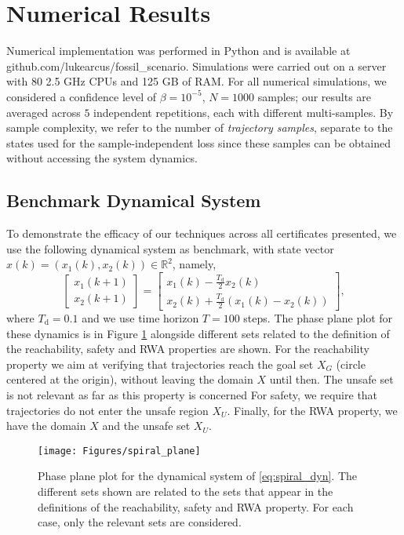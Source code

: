 \section{Numerical Results}
\label{sec:exp}

Numerical implementation was performed in Python and is available at github.com/lukearcus/fossil\_scenario. 
Simulations were carried out on a server with 80 2.5 GHz CPUs and 125 GB of RAM. 
For all numerical simulations, we considered a confidence level of $\beta=10^{-5}$, $N=1000$ samples; our results are averaged across $5$ independent repetitions, each with different multi-samples. 
By sample complexity, we refer to the number of \emph{trajectory samples}, separate to the states used for the sample-independent loss since these samples can be obtained without accessing the system dynamics.

\subsection{Benchmark Dynamical System}

To demonstrate the efficacy of our techniques across all certificates presented, we use the following dynamical system as benchmark, with state vector $x(k) = (x_1(k), x_2(k)) \in \mathbb{R}^2$, namely,
\begin{equation}
	\label{eq:spiral_dyn}
	\begin{bmatrix}x_1(k+1)\\x_2(k+1)\end{bmatrix}=\begin{bmatrix}x_1(k)-\frac{T_\text{d}}{2}x_2(k)\\ x_2(k)+\frac{T_\text{d}}{2}(x_1(k)-x_2(k))\end{bmatrix},
\end{equation}
where $T_\text{d} = 0.1$ and we use time horizon $T=100$ steps.
The phase plane plot for these dynamics is in Figure \ref{fig:spiral_phase} alongside different sets related to the definition of the reachability, safety and RWA properties are shown. For the reachability property we aim at verifying that trajectories reach the goal set $X_G$ (circle centered at the origin), without 
leaving the domain $X$ until then. The unsafe set is not relevant as far as this property is concerned
For safety, we require that trajectories do not enter the unsafe region $X_U$.
Finally, for the RWA property, we have the domain $X$ and the unsafe set $X_U$.

\begin{figure}[t]
\centering
	\texttt{[image: Figures/spiral\_plane]}
	\caption{Phase plane plot for the dynamical system of \eqref{eq:spiral_dyn}. The different sets shown are related to the sets that appear in the definitions of the reachability, safety and RWA property. For each case, only the relevant sets are considered.}
	\label{fig:spiral_phase}
\end{figure}

